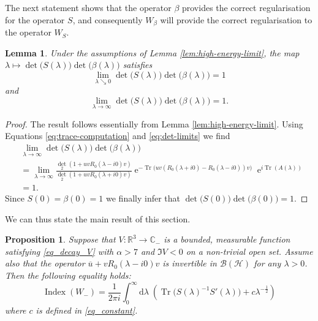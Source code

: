 \documentclass{article}
\def\B{\mathscr B}
\def\C{\mathbb C}
\def\d{\mathrm{d}}
\def\H{\mathcal H}
\def\R{\mathbb R}
\def\e{\mathop{\mathrm{e}}\nolimits}
\def\index{\mathop{\mathrm{Index}}\nolimits}
\def\Tr{\mathop{\mathrm{Tr}}\nolimits}
\newtheorem{Lemma}[Theorem]{Lemma}
\newtheorem{Proposition}[Theorem]{Proposition}
\begin{document}
The next statement shows that the operator $\beta$ provides the correct regularisation for the operator $S$, and consequently $W_\beta$ will provide the correct regularisation
to the operator $W_S$.

\begin{Lemma}\label{lem:det-loop}
Under the assumptions of Lemma \ref{lem:high-energy-limit},
 the map $\lambda \mapsto \det\big(S(\lambda)\big)\det\big(\beta(\lambda)\big)$ satisfies
\begin{equation*}
\lim_{\lambda \searrow 0} \det\big(S(\lambda)\big)\det\big(\beta(\lambda)\big) = 1
\end{equation*}
and 
\begin{equation*}
\lim_{\lambda \to \infty} \det\big(S(\lambda)\big)\det\big(\beta(\lambda)\big) = 1.
\end{equation*}
\end{Lemma}

\begin{proof}
The result follows essentially from Lemma \ref{lem:high-energy-limit}. Using Equations \eqref{eq:trace-computation} and \eqref{eq:det-limits} we find
\begin{align*}
&\lim_{\lambda \to \infty} \det\big(S(\lambda)\big) \det\big(\beta(\lambda)\big) \\
&= \lim_{\lambda \to \infty} \frac{\det_2(1+uvR_0(\lambda-i0)v)}{\det_2(1+uvR_0(\lambda+i0)v)} \e^{-\Tr\big(uv(R_0(\lambda+i0)-R_0(\lambda-i0))v)} \e^{i \Tr(A(\lambda))} \\
&= 1.
\end{align*}
Since $S(0) = \beta(0) = 1$ we finally infer that $\det\big(S(0)\big) \det\big(\beta(0)\big) = 1$.
\end{proof}

We can thus state the main result of this section.

\begin{Proposition}\label{prop:comput}
Suppose that $V:\R^3\to \C_-$ is a bounded, measurable function satisfying \eqref{eq_decay_V} with $\alpha>7$ and $\Im V<0$ on a non-trivial open set.
Assume also that the operator $\overline{u} + vR_0(\lambda-i0)v$ is invertible in $\B(\H)$ for any $\lambda > 0$. 
Then the following equality holds: 
\begin{equation*}
\index(W_-) = \frac{1}{2\pi i} \int_0^\infty \d \lambda \;\!\left(\Tr\big(S(\lambda)^{-1}S'(\lambda)\big) + c \lambda^{-\frac12} \right)
\end{equation*}
where $c$ is defined in \eqref{eq_constant}.
\end{Proposition}
\end{document}
